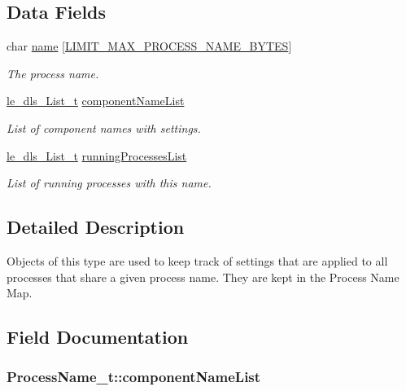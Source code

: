 \subsection*{Data Fields}
\begin{DoxyCompactItemize}
\item 
char \hyperlink{struct_process_name__t_af99fe462162508666c8917e0653f6c83}{name} \mbox{[}\hyperlink{limit_8h_aa34277e61725bc1003ab172a078531cf}{L\+I\+M\+I\+T\+\_\+\+M\+A\+X\+\_\+\+P\+R\+O\+C\+E\+S\+S\+\_\+\+N\+A\+M\+E\+\_\+\+B\+Y\+T\+ES}\mbox{]}
\begin{DoxyCompactList}\small\item\em The process name. \end{DoxyCompactList}\item 
\hyperlink{structle__dls___list__t}{le\+\_\+dls\+\_\+\+List\+\_\+t} \hyperlink{struct_process_name__t_ae2c5e4ab065ca623ff0b65de5dc14d0d}{component\+Name\+List}
\begin{DoxyCompactList}\small\item\em List of component names with settings. \end{DoxyCompactList}\item 
\hyperlink{structle__dls___list__t}{le\+\_\+dls\+\_\+\+List\+\_\+t} \hyperlink{struct_process_name__t_aa1c0fc7dc784ead2a354009c292bf9e8}{running\+Processes\+List}
\begin{DoxyCompactList}\small\item\em List of running processes with this name. \end{DoxyCompactList}\end{DoxyCompactItemize}


\subsection{Detailed Description}
Objects of this type are used to keep track of settings that are applied to all processes that share a given process name. They are kept in the Process Name Map. 

\subsection{Field Documentation}
\subsubsection[{\texorpdfstring{component\+Name\+List}{componentNameList}}]{ Process\+Name\+\_\+t\+::component\+Name\+List}\hypertarget{struct_process_name__t_ae2c5e4ab065ca623ff0b65de5dc14d0d}{}\label{struct_process_name__t_ae2c5e4ab065ca623ff0b65de5dc14d0d}


